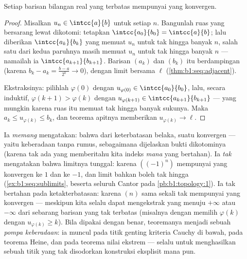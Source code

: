\begin{theorem}\label{thm:b1:seq:bw}
Setiap barisan bilangan real yang terbatas mempunyai  yang
konvergen.
\end{theorem}

\begin{proof}
Misalkan $u_n \in \intcc{a}{b}$ untuk setiap $n$. Bangunlah ruas yang bersarang lewat
dikotomi: tetapkan $\intcc{a_0}{b_0} = \intcc{a}{b}$; lalu diberikan
$\intcc{a_k}{b_k}$ yang memuat $u_n$ untuk tak hingga banyak $n$, salah satu
dari kedua paruhnya masih memuat $u_n$ untuk tak hingga banyak $n$ --- namailah
ia $\intcc{a_{k+1}}{b_{k+1}}$. Barisan $(a_k)$ dan $(b_k)$ itu
berdampingan (karena $b_k - a_k = \frac{b-a}{2^k} \to 0$), dengan limit bersama
$\ell$ (\cref{thm:b1:seq:adjacent}).

Ekstraksinya: pilihlah $\varphi(0)$ dengan $u_{\varphi(0)} \in
\intcc{a_0}{b_0}$, lalu, secara induktif, $\varphi(k+1) > \varphi(k)$
dengan $u_{\varphi(k+1)} \in \intcc{a_{k+1}}{b_{k+1}}$ --- yang mungkin
karena ruas itu memuat tak hingga banyak sukunya. Maka $a_k \leq
u_{\varphi(k)} \leq b_k$, dan teorema apitnya memberikan
$u_{\varphi(k)} \to \ell$.
\end{proof}

\begin{remark}
Ia \emph{memang} mengatakan: bahwa dari keterbatasan belaka, suatu 
konvergen --- yaitu keberadaan tanpa rumus, sebagaimana dijelaskan bukti
dikotominya (karena tak ada yang memberitahu kita indeks \emph{mana} yang bertahan). Ia
\emph{tak} mengatakan bahwa limitnya tunggal: karena $((-1)^n)$ mempunyai
 yang konvergen ke $1$ dan ke $-1$, dan 
limit  bahkan boleh tak hingga
(\cref{ex:b1:seq:sublimits}, beserta seluruh  Cantor pada
\cref{pb:b1:topology:1}). Ia tak bertahan pada ketakterbatasan:
karena $(n)$ sama sekali tak mempunyai  yang konvergen --- meskipun kita
selalu dapat mengekstrak  yang menuju $+\infty$ atau $-\infty$
dari sebarang barisan yang tak terbatas (misalnya dengan memilih $\varphi(k)$ dengan
$u_{\varphi(k)} \geq k$). Bila dipakai dengan benar, teoremanya menjadi sebuah
\emph{pompa keberadaan}: ia muncul pada titik genting kriteria
Cauchy di bawah, pada teorema Heine, dan pada teorema nilai
ekstrem --- selalu untuk menghasilkan sebuah titik yang tak disodorkan konstruksi
eksplisit mana pun.
\end{remark}

